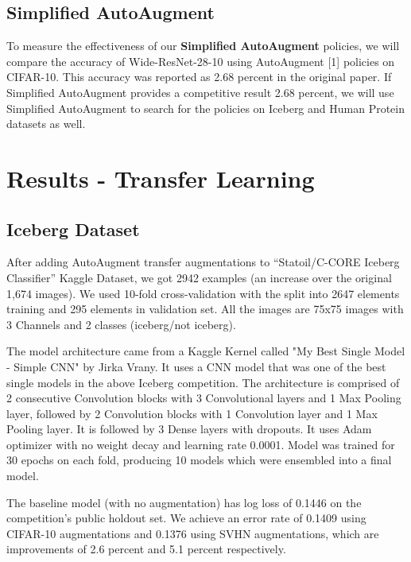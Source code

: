 \documentclass[10pt,twocolumn,letterpaper]{article}
\begin{document}
\subsection{Simplified AutoAugment}

To measure the effectiveness of our \textbf{Simplified AutoAugment} policies, we will compare the accuracy of Wide-ResNet-28-10 using AutoAugment [1] policies on CIFAR-10.  This accuracy was reported as 2.68 percent in the original paper.  If Simplified AutoAugment provides a competitive result 2.68 percent, we will use Simplified AutoAugment to search for the policies on Iceberg and Human Protein datasets as well.



\section{Results - Transfer Learning}

\subsection{Iceberg Dataset}

After adding AutoAugment transfer augmentations to “Statoil/C-CORE Iceberg Classifier” Kaggle Dataset, we got 2942 examples (an increase over the original 1,674 images). We used 10-fold cross-validation with the split into 2647 elements training and 295 elements in validation set. All the images are 75x75 images with 3 Channels and 2 classes (iceberg/not iceberg).

The model architecture came from a Kaggle Kernel called "My Best Single Model - Simple CNN" by Jirka Vrany.  It uses a CNN model that was one of the best single models in the above Iceberg competition. The architecture is comprised of 2 consecutive Convolution blocks with 3 Convolutional layers and 1 Max Pooling layer, followed by 2 Convolution blocks with 1 Convolution layer and 1 Max Pooling layer. It is followed by 3 Dense layers with dropouts. It uses Adam optimizer with no weight decay and learning rate 0.0001. Model was trained for 30 epochs on each fold, producing 10 models which were ensembled into a final model.

The baseline model (with no augmentation) has log loss of 0.1446 on the competition's public holdout set. We achieve an error rate of 0.1409 using CIFAR-10 augmentations and 0.1376 using SVHN augmentations, which are improvements of 2.6 percent and 5.1 percent respectively.
\end{document}
